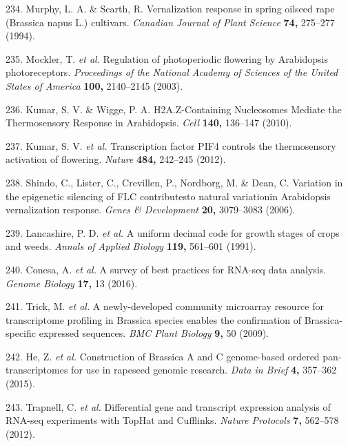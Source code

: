 \documentclass[12pt,]{book}
\begin{document}
\hypertarget{ref-murphy_vernalization_1994}{}
234. Murphy, L. A. \& Scarth, R. Vernalization response in spring
oilseed rape (Brassica napus L.) cultivars. \emph{Canadian Journal of
Plant Science} \textbf{74,} 275--277 (1994).

\hypertarget{ref-mockler_regulation_2003}{}
235. Mockler, T. \emph{et al.} Regulation of photoperiodic flowering by
Arabidopsis photoreceptors. \emph{Proceedings of the National Academy of
Sciences of the United States of America} \textbf{100,} 2140--2145
(2003).

\hypertarget{ref-kumar_h2az_containing_2010}{}
236. Kumar, S. V. \& Wigge, P. A. H2A.Z-Containing Nucleosomes Mediate
the Thermosensory Response in Arabidopsis. \emph{Cell} \textbf{140,}
136--147 (2010).

\hypertarget{ref-kumar_transcription_2012}{}
237. Kumar, S. V. \emph{et al.} Transcription factor PIF4 controls the
thermosensory activation of flowering. \emph{Nature} \textbf{484,}
242--245 (2012).

\hypertarget{ref-shindo_variation_2006}{}
238. Shindo, C., Lister, C., Crevillen, P., Nordborg, M. \& Dean, C.
Variation in the epigenetic silencing of FLC contributesto natural
variationin Arabidopsis vernalization response. \emph{Genes \&
Development} \textbf{20,} 3079--3083 (2006).

\hypertarget{ref-lancashire_uniform_1991}{}
239. Lancashire, P. D. \emph{et al.} A uniform decimal code for growth
stages of crops and weeds. \emph{Annals of Applied Biology}
\textbf{119,} 561--601 (1991).

\hypertarget{ref-conesa_survey_2016}{}
240. Conesa, A. \emph{et al.} A survey of best practices for RNA-seq
data analysis. \emph{Genome Biology} \textbf{17,} 13 (2016).

\hypertarget{ref-trick_unigene_2009}{}
241. Trick, M. \emph{et al.} A newly-developed community microarray
resource for transcriptome profiling in Brassica species enables the
confirmation of Brassica-specific expressed sequences. \emph{BMC Plant
Biology} \textbf{9,} 50 (2009).

\hypertarget{ref-he_construction_2015}{}
242. He, Z. \emph{et al.} Construction of Brassica A and C genome-based
ordered pan-transcriptomes for use in rapeseed genomic research.
\emph{Data in Brief} \textbf{4,} 357--362 (2015).

\hypertarget{ref-trapnell_differential_2012}{}
243. Trapnell, C. \emph{et al.} Differential gene and transcript
expression analysis of RNA-seq experiments with TopHat and Cufflinks.
\emph{Nature Protocols} \textbf{7,} 562--578 (2012).
\end{document}
